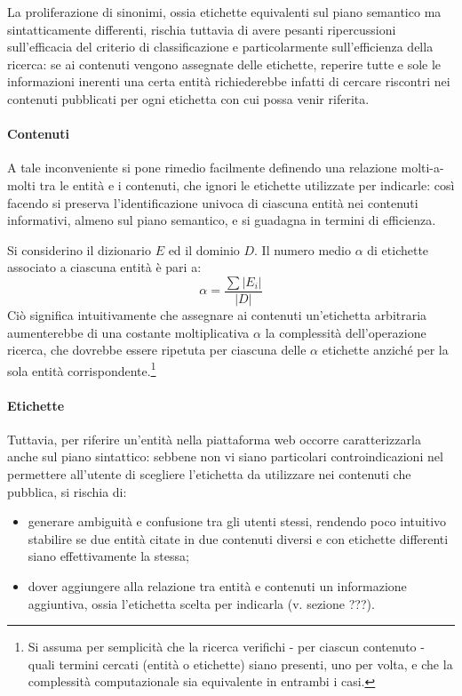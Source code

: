 La proliferazione di sinonimi, ossia etichette equivalenti sul piano semantico ma sintatticamente differenti, rischia tuttavia di avere pesanti ripercussioni sull'efficacia del criterio di classificazione e particolarmente sull'efficienza della ricerca: se ai contenuti vengono assegnate delle etichette, reperire tutte e sole le informazioni inerenti una certa entità richiederebbe infatti di cercare riscontri nei contenuti pubblicati per ogni etichetta con cui possa venir riferita.

\paragraph{Contenuti}
A tale inconveniente si pone rimedio facilmente definendo una relazione molti-a-molti tra le entità e i contenuti, che ignori le etichette utilizzate per indicarle: così facendo si preserva l'identificazione univoca di ciascuna entità nei contenuti informativi, almeno sul piano semantico, e si guadagna in termini di efficienza.

Si considerino il dizionario $E$ ed il dominio $D$. Il numero medio $\alpha$ di etichette associato a ciascuna entità è pari a:
\begin{equation}
\alpha = \frac{\sum{\left|E_i\right|}}{\left|D\right|}
\end{equation}
Ciò significa intuitivamente che assegnare ai contenuti un'etichetta arbitraria aumenterebbe di una costante moltiplicativa $\alpha$ la complessità dell'operazione ricerca, che dovrebbe essere ripetuta per ciascuna delle $\alpha$ etichette anziché per la sola entità corrispondente.\footnote{Si assuma per semplicità che la ricerca verifichi - per ciascun contenuto - quali termini cercati (entità o etichette) siano presenti, uno per volta, e che la complessità computazionale sia equivalente in entrambi i casi.}

\paragraph{Etichette}
Tuttavia, per riferire un'entità nella piattaforma web occorre caratterizzarla anche sul piano sintattico: sebbene non vi siano particolari controindicazioni nel permettere all'utente di scegliere l'etichetta da utilizzare nei contenuti che pubblica, si rischia di:
\begin{itemize}
	\item generare ambiguità e confusione tra gli utenti stessi, rendendo poco intuitivo stabilire se due entità citate in due contenuti diversi e con etichette differenti siano effettivamente la stessa;
	\item dover aggiungere alla relazione tra entità e contenuti un informazione aggiuntiva, ossia l'etichetta scelta per indicarla (v. sezione ???).
\end{itemize}

